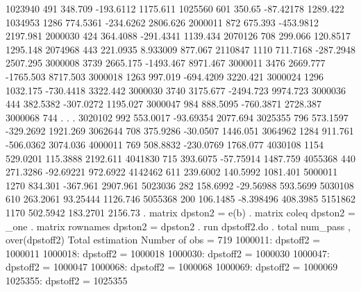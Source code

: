      1023940 {\VBAR}        491    348.709     -193.6112    1175.611
     1025560 {\VBAR}        601     350.65     -87.42178    1289.422
     1034953 {\VBAR}       1286   774.5361     -234.6262    2806.626
     2000011 {\VBAR}        872    675.393     -453.9812    2197.981
     2000030 {\VBAR}        424   364.4088     -291.4341    1139.434
     2070126 {\VBAR}        708    299.066      120.8517    1295.148
     2074968 {\VBAR}        443   221.0935      8.933009     877.067
     2110847 {\VBAR}       1110   711.7168     -287.2948    2507.295
     3000008 {\VBAR}       3739   2665.175     -1493.467    8971.467
     3000011 {\VBAR}       3476   2669.777     -1765.503    8717.503
     3000018 {\VBAR}       1263    997.019     -694.4209    3220.421
     3000024 {\VBAR}       1296   1032.175     -730.4418    3322.442
     3000030 {\VBAR}       3740   3175.677     -2494.723    9974.723
     3000036 {\VBAR}        444   382.5382     -307.0272    1195.027
     3000047 {\VBAR}        984   888.5095     -760.3871    2728.387
     3000068 {\VBAR}        744          .             .           .
     3020102 {\VBAR}        992   553.0017     -93.69354    2077.694
     3025355 {\VBAR}        796   573.1597     -329.2692    1921.269
     3062644 {\VBAR}        708   375.9286      -30.0507    1446.051
     3064962 {\VBAR}       1284    911.761     -506.0362    3074.036
     4000011 {\VBAR}        769   508.8832     -230.0769    1768.077
     4030108 {\VBAR}       1154   529.0201      115.3888    2192.611
     4041830 {\VBAR}        715   393.6075     -57.75914    1487.759
     4055368 {\VBAR}        440   271.3286     -92.69221    972.6922
     4142462 {\VBAR}        611   239.6002      140.5992    1081.401
     5000011 {\VBAR}       1270    834.301      -367.961    2907.961
     5023036 {\VBAR}        282   158.6992     -29.56988    593.5699
     5030108 {\VBAR}        610   263.2061      93.25444    1126.746
     5055368 {\VBAR}        200   106.1485     -8.398496    408.3985
     5151862 {\VBAR}       1170   502.5942      183.2701     2156.73
{\smallskip}
. matrix dpston2 = e(b)
{\smallskip}
. matrix coleq dpston2 = _one
{\smallskip}
. matrix rownames dpston2 = dpston2
{\smallskip}
. run dpstoff2.do
{\smallskip}
. total num_pass , over(dpstoff2)
{\smallskip}
Total estimation                  Number of obs   =        719
{\smallskip}
      1000011: dpstoff2 = 1000011
      1000018: dpstoff2 = 1000018
      1000030: dpstoff2 = 1000030
      1000047: dpstoff2 = 1000047
      1000068: dpstoff2 = 1000068
      1000069: dpstoff2 = 1000069
      1025355: dpstoff2 = 1025355
